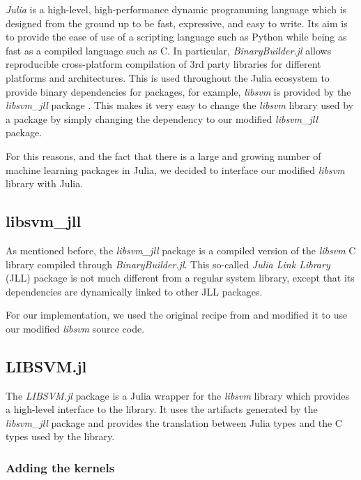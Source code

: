 \emph{Julia} \cite{bezanson2017julia} is a high-level, high-performance dynamic programming language
which is designed from the ground up to be fast, expressive, and easy to write. Its aim is to provide
the ease of use of a scripting language such as Python while being as fast as a compiled language
such as C. In particular, \emph{BinaryBuilder.jl} \cite{JLLPackagesBinaryBuilder} allows reproducible
cross-platform compilation of 3rd party libraries for different platforms and architectures.
This is used throughout the Julia ecosystem to provide binary dependencies for packages,
for example, \emph{libsvm} is provided by the \emph{libsvm\_jll} package \cite{LibsvmJllJl2022}.
This makes it very easy to change the \emph{libsvm} library used by a package by simply changing
the dependency to our modified \emph{libsvm\_jll} package.

For this reasons, and the fact that there is a large and growing number of machine learning
packages in Julia, we decided to interface our modified \emph{libsvm} library with Julia.

\subsection{libsvm\_jll}

As mentioned before, the \emph{libsvm\_jll} package is a compiled version of the \emph{libsvm} C library
compiled through \emph{BinaryBuilder.jl}. This so-called \emph{Julia Link Library} (JLL) package
is not much different from a regular system library, except that its dependencies are dynamically
linked to other JLL packages.

For our implementation, we used the original recipe from \textcite{LibsvmJllJl2022} and modified it
to use our modified \emph{libsvm} source code.

\subsection{LIBSVM.jl}

The \emph{LIBSVM.jl} package \cite{LIBSVMJl2023} is a Julia wrapper for the \emph{libsvm} library which
provides a high-level interface to the library. It uses the artifacts generated by the \emph{libsvm\_jll}
package and provides the translation between Julia types and the C types used by the library.

\subsubsection{Adding the kernels}

